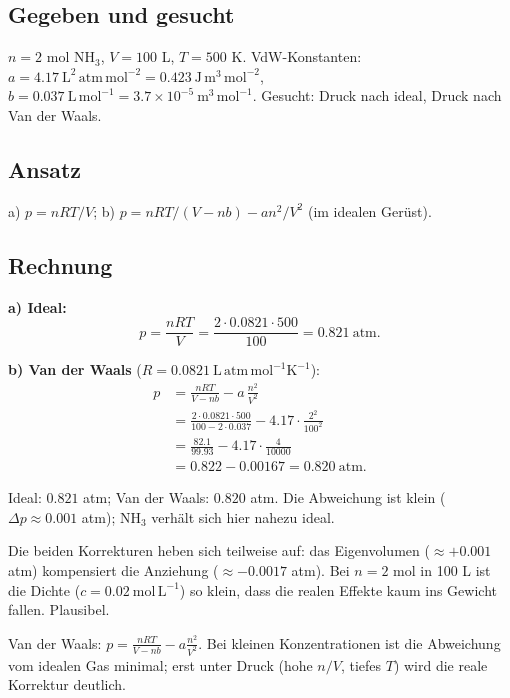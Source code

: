 
\subsection*{Gegeben und gesucht}
$n=2$ mol $\mathrm{NH_3}$, $V=100$ L, $T=500$ K. VdW-Konstanten:
$a=4.17\ \mathrm{L^2\,atm\,mol^{-2}}=0.423\ \mathrm{J\,m^3\,mol^{-2}}$,
$b=0.037\ \mathrm{L\,mol^{-1}}=3.7\times10^{-5}\ \mathrm{m^3\,mol^{-1}}$.
Gesucht: Druck nach ideal, Druck nach Van der Waals.

\subsection*{Ansatz}
a) $p=nRT/V$; b) $p=nRT/(V-nb) - a n^2/V^2$ (im idealen Gerüst).

\subsection*{Rechnung}
\textbf{a) Ideal:}
\[
  p = \frac{nRT}{V} = \frac{2\cdot 0.0821\cdot 500}{100}
   = 0.821\ \mathrm{atm} .
\]

\textbf{b) Van der Waals} ($R=0.0821\ \mathrm{L\,atm\,mol^{-1}K^{-1}}$):
\begin{align*}
  p &= \frac{nRT}{V-nb} - a\,\frac{n^2}{V^2}\\
    &= \frac{2\cdot 0.0821\cdot 500}{100 - 2\cdot 0.037}
       - 4.17\cdot\frac{2^2}{100^2}\\
    &= \frac{82.1}{99.93} - 4.17\cdot\frac{4}{10000}\\
    &= 0.822 - 0.00167 = 0.820\ \mathrm{atm}.
\end{align*}

\begin{ergebnis}
Ideal: $0.821$ atm; Van der Waals: $0.820$ atm. Die Abweichung ist klein
($\Delta p \approx 0.001$ atm); NH$_3$ verh\"alt sich hier nahezu ideal.
\end{ergebnis}

\begin{kontrolle}
Die beiden Korrekturen heben sich teilweise auf: das Eigenvolumen
($\approx +0.001$ atm) kompensiert die Anziehung ($\approx -0.0017$ atm).
Bei $n=2$ mol in 100 L ist die Dichte ($c = 0.02\ \mathrm{mol\,L^{-1}}$)
so klein, dass die realen Effekte kaum ins Gewicht fallen. Plausibel.
\end{kontrolle}

\begin{merksatz}
Van der Waals: $p = \frac{nRT}{V-nb} - a\frac{n^2}{V^2}$. Bei kleinen
Konzentrationen ist die Abweichung vom idealen Gas minimal; erst unter
Druck (hohe $n/V$, tiefes $T$) wird die reale Korrektur deutlich.
\end{merksatz}
